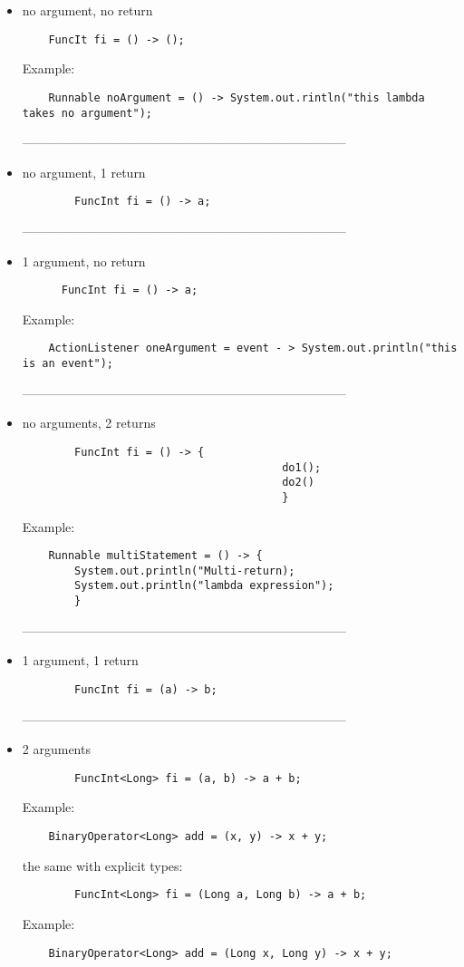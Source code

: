 \documentclass{report}
\begin{document}
\begin{itemize}
	\item no argument, no return
	\begin{verbatim}
	FuncIt fi = () -> ();
	\end{verbatim}
	
	Example:
	\begin{verbatim}
	Runnable noArgument = () -> System.out.rintln("this lambda takes no argument");
	\end{verbatim}
	-----------------------------------------------------------------------------
	\item no argument, 1 return
	\begin{verbatim}
		FuncInt fi = () -> a;
	\end{verbatim}
	-----------------------------------------------------------------------------
	
	\item 1 argument, no return
	\begin{verbatim}
	  FuncInt fi = () -> a;	
	\end{verbatim}
	Example:
	\begin{verbatim}
	ActionListener oneArgument = event - > System.out.println("this is an event"); 
	\end{verbatim}
		-----------------------------------------------------------------------------
	
	\item no arguments, 2 returns
	\begin{verbatim}
		FuncInt fi = () -> {
										do1();
										do2()
										}
	\end{verbatim}
	Example:
	\begin{verbatim}
	Runnable multiStatement = () -> {
		System.out.println("Multi-return);
		System.out.println("lambda expression");
		}
	\end{verbatim}
	-----------------------------------------------------------------------------
	
	\item 1 argument, 1 return
	\begin{verbatim}
		FuncInt fi = (a) -> b;
	\end{verbatim}
		-----------------------------------------------------------------------------
	\item 2 arguments
	\begin{verbatim}
		FuncInt<Long> fi = (a, b) -> a + b;
	\end{verbatim}
	Example:
	\begin{verbatim}
	BinaryOperator<Long> add = (x, y) -> x + y;
	\end{verbatim}
	
	the same with explicit types:
	\begin{verbatim}
		FuncInt<Long> fi = (Long a, Long b) -> a + b;
	\end{verbatim}
	Example:
	\begin{verbatim}
	BinaryOperator<Long> add = (Long x, Long y) -> x + y;
	\end{verbatim}
\end{itemize}
\end{document}
